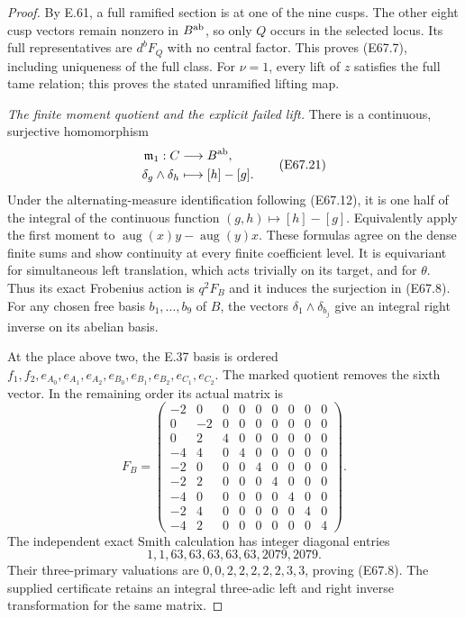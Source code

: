 \begin{proof}
By E.61, a full ramified section is at one of the nine
cusps. The other eight cusp vectors remain nonzero in
$B^{\rm ab}$, so only $Q$ occurs in the selected locus.
Its full representatives are $d^bF_Q$ with no central
factor. This proves (E67.7), including uniqueness of
the full class. For $\nu=1$, every lift of $z$ satisfies
the full tame relation; this proves the stated
unramified lifting map.

\emph{The finite moment quotient and the explicit failed lift.}
There is a continuous, surjective homomorphism
\[
 \begin{split}
 \mathfrak m_1:C&\longrightarrow B^{\rm ab},\\
 \delta_g\wedge\delta_h&\longmapsto[h]-[g].
 \end{split}
 \tag{E67.21}
\]
Under the alternating-measure identification following
(E67.12), it is one half of the integral of the
continuous function $(g,h)\mapsto[h]-[g]$.
Equivalently apply the first moment to
$\operatorname{aug}(x)y-\operatorname{aug}(y)x$.
These formulas agree on the dense finite sums and show
continuity at every finite coefficient level.
It is equivariant for simultaneous left translation,
which acts trivially on its target, and for $\theta$.
Thus its exact Frobenius action is $q^2F_B$ and it
induces the surjection in (E67.8).
For any chosen free basis $b_1,\ldots,b_9$ of $B$,
the vectors $\delta_1\wedge\delta_{b_j}$ give an
integral right inverse on its abelian basis.

At the place above two, the E.37 basis is ordered
$f_1,f_2,e_{A_0},e_{A_1},e_{A_2},e_{B_0},e_{B_1},
e_{B_2},e_{C_1},e_{C_2}$. The marked quotient removes
the sixth vector. In the remaining order its actual
matrix is
\[
 F_B=\begin{pmatrix}
 -2&0&0&0&0&0&0&0&0\\
 0&-2&0&0&0&0&0&0&0\\
 0&2&4&0&0&0&0&0&0\\
 -4&4&0&4&0&0&0&0&0\\
 -2&0&0&0&4&0&0&0&0\\
 -2&2&0&0&0&4&0&0&0\\
 -4&0&0&0&0&0&4&0&0\\
 -2&4&0&0&0&0&0&4&0\\
 -4&2&0&0&0&0&0&0&4
 \end{pmatrix}.
 \tag{E67.22}
\]
The independent exact Smith calculation has integer
diagonal entries
\[
 1,1,63,63,63,63,63,2079,2079.
\]
Their three-primary valuations are
$0,0,2,2,2,2,2,3,3$, proving (E67.8).
The supplied certificate retains an integral
three-adic left and right inverse transformation for
the same matrix.


\end{proof}
